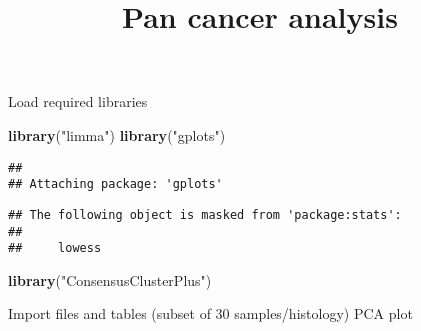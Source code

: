 \documentclass[
]{article}
\title{Pan cancer analysis}
\author{}
\date{\vspace{-2.5em}}
\newenvironment{Shaded}{\begin{snugshade}}{\end{snugshade}}
\newcommand{\KeywordTok}[1]{\textcolor[rgb]{0.13,0.29,0.53}{\textbf{#1}}}
\newcommand{\NormalTok}[1]{#1}
\newcommand{\StringTok}[1]{\textcolor[rgb]{0.31,0.60,0.02}{#1}}
\begin{document}
\maketitle

Load required libraries

\begin{Shaded}
\begin{Highlighting}[]
\KeywordTok{library}\NormalTok{(}\StringTok{"limma"}\NormalTok{)}
\KeywordTok{library}\NormalTok{(}\StringTok{"gplots"}\NormalTok{)}
\end{Highlighting}
\end{Shaded}

\begin{verbatim}
## 
## Attaching package: 'gplots'
\end{verbatim}

\begin{verbatim}
## The following object is masked from 'package:stats':
## 
##     lowess
\end{verbatim}

\begin{Shaded}
\begin{Highlighting}[]
\KeywordTok{library}\NormalTok{(}\StringTok{"ConsensusClusterPlus"}\NormalTok{)}
\end{Highlighting}
\end{Shaded}

Import files and tables (subset of 30 samples/histology) PCA plot
\end{document}
